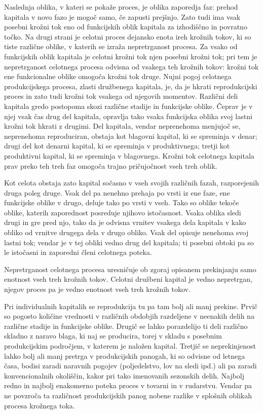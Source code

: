 \documentclass[kapital_02.tex]{subfiles}
\begin{document}
Naslednja oblika, v kateri se pokaže proces, je oblika zaporedja faz: prehod kapitala v novo fazo je mogoč samo, če zapusti prejšnjo. Zato tudi ima vsak posebni krožni tok eno od funkcijskih oblik kapitala za izhodiščno in povratno točko. Na drugi strani je celotni proces dejansko enota ireh krožnih tokov, ki so tiste različne oblike, v katerih se izraža nepretrganost procesa. Za vsako od funkcijskih oblik kapitala je celotni krožni tok njen posebni krožni tok; pri tem je nepretrganost celotnega procesa odvisna od vsakega teh krožnih tokov: krožni tok ene funkcionalne oblike omogoča krožni tok druge. Nujni pogoj celotnega produkcijskega procesa, zlasti družbenega kapitala, je, da je hkrati reprodukcijski proces in zato tudi krožni tok vsakega od njegovih momentov. Različni deli kapitala gredo postopoma skozi različne stadije in funkcijske oblike. Čeprav je v njej vsak čas drug del kapitala, opravlja tako vsaka funkcijska oblika svoj lastni krožni tok hkrati z drugimi. Del kapitala, vendar neprenehoma menjujoč se, neprenehoma reproduciran, obstaja kot blagovni kapital, ki se spreminja v denar; drugi del kot denarni kapital, ki se spreminja v produktivnega; tretji kot produktivni kapital, ki se spreminja v blagovnega. Krožni tok celotnega kapitala prav preko teh treh faz omogoča trajno pričujočnost vseh treh oblik.

Kot celota obstaja zato kapital sočasno v vseh svojih različnih fazah, razporejenih druga poleg druge. Vsak del pa nenehno prehaja po vrsti iz ene faze, ene funkcijske oblike \KPEstran v drugo, deluje tako po vrsti v vseh. Tako so oblike tekoče oblike, katerih zaporednost posreduje njihovo istočasnost. Vsaka oblika sledi drugi in gre pred njo, tako da je odvisna vrnitev vsakega dela kapitala v kako obliko od vrnitve drugega dela v drugo obliko. Vsak del opisuje nenehoma svoj lastni tok; vendar je v tej obliki vedno drug del kapitala; ti posebni obtoki pa so le istočasni in zaporedni členi celotnega poteka.

Nepretrganost celotnega procesa uresničuje ob zgoraj opisanem prekinjanju samo enotnost vseh treh krožnih tokov. Celotni družbeni kapital je vedno nepretrgan, njegov proces pa je vedno enotnost vseh treh krožnih tokov.

Pri individualnih kapitalih se reprodukcija tu pa tam bolj ali manj prekine. Prvič so pogosto količine vrednosti v različnih obdobjih razdeljene v neenakih delih na različne stadije in funkcijske oblike. Drugič se lahko porazdelijo ti deli različno skladno z naravo blaga, ki naj se producira, torej v skladu s posebnim produkcijskim področjem, v katerem je naložen kapital. Tretjič se neprekinjenost lahko bolj ali manj pretrga v produkcijskih panogah, ki so odvisne od letnega časa, bodisi zaradi naravnih pogojev (poljedelstvo, lov na sledi ipd.) ali pa zaradi konvencionalnih okoliščin, kakor pri tako imenovanih sezonskih delih. Najbolj redno in najbolj enakomerno poteka proces v tovarni in v rudarstvu. Vendar pa ne povzroča ta različnost produkcijskih panog nobene razlike v splošnih oblikah procesa krožnega toka.
\end{document}

